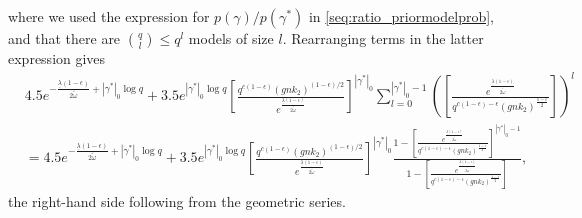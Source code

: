 where we used the expression for $p(\gamma)/p(\gamma^*)$ in \eqref{seq:ratio_priormodelprob},
and that there are ${q \choose l} \leq q^l$ models of size $l$.
Rearranging terms in the latter expression gives
\begin{align}
& 4.5 e^{-\frac{\underline{\lambda}(1-\epsilon)}{2 \tilde{\omega}} + |\gamma^*|_0\log q} +
3.5 e^{|\gamma^*|_0 \log q}
\left[ \frac{q^{c(1-\epsilon)} (gnk_2)^{(1-\epsilon)/2}}{ e^{\frac{\underline{\lambda}(1-\epsilon)}{2 \tilde{\omega}}} } \right]^{|\gamma^*|_0}
 \sum_{l=0}^{|\gamma^*|_0-1} 
 \left( \left[ \frac{ e^{\frac{\underline{\lambda}(1-\epsilon)}{2 \tilde{\omega}}} }{q^{c(1-\epsilon)-\epsilon} (gnk_2)^{\frac{1-\epsilon}{2}}} \right] \right)^{l}
\nonumber \\
&=
4.5 e^{-\frac{\underline{\lambda}(1-\epsilon)}{2 \tilde{\omega}} + |\gamma^*|_0\log q} +
3.5 e^{|\gamma^*|_0 \log q}
\left[ \frac{q^{c(1-\epsilon)} (gnk_2)^{(1-\epsilon)/2}}{ e^{\frac{\underline{\lambda}(1-\epsilon)}{2 \tilde{\omega}}} } \right]^{|\gamma^*|_0}
\frac{1 - \left[ \frac{ e^{\frac{\underline{\lambda}(1-\epsilon)}{2 \tilde{\omega}}} }{q^{c(1-\epsilon)-\epsilon} (gnk_2)^{\frac{1-\epsilon}{2}}} \right]^{|\gamma^*|_0 -1} }{1 - \left[ \frac{ e^{\frac{\underline{\lambda}(1-\epsilon)}{2 \tilde{\omega}}} }{q^{c(1-\epsilon)-\epsilon} (gnk_2)^{\frac{1-\epsilon}{2}}} \right]}
,
\label{seq:pp_smallnonoverfit2}
\end{align}
the right-hand side following from the geometric series.

